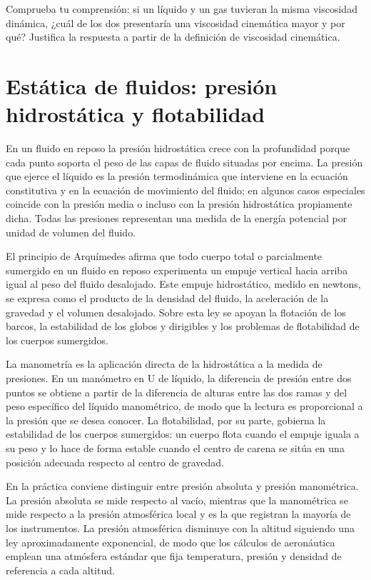 \documentclass{book}
\begin{document}
\begin{tcolorbox}[title={Autoficha}, studiumcheck, breakable]

Comprueba tu comprensión: si un líquido y un gas tuvieran la misma viscosidad dinámica, ¿cuál de los dos presentaría una viscosidad cinemática mayor y por qué? Justifica la respuesta a partir de la definición de viscosidad cinemática.
\end{tcolorbox}

\chapter{Estática de fluidos: presión hidrostática y flotabilidad}

En un fluido en reposo la presión hidrostática crece con la profundidad porque cada punto soporta el peso de las capas de fluido situadas por encima. La presión que ejerce el líquido es la presión termodinámica que interviene en la ecuación constitutiva y en la ecuación de movimiento del fluido; en algunos casos especiales coincide con la presión media o incluso con la presión hidrostática propiamente dicha. Todas las presiones representan una medida de la energía potencial por unidad de volumen del fluido.

El principio de Arquímedes afirma que todo cuerpo total o parcialmente sumergido en un fluido en reposo experimenta un empuje vertical hacia arriba igual al peso del fluido desalojado. Este empuje hidrostático, medido en newtons, se expresa como el producto de la densidad del fluido, la aceleración de la gravedad y el volumen desalojado. Sobre esta ley se apoyan la flotación de los barcos, la estabilidad de los globos y dirigibles y los problemas de flotabilidad de los cuerpos sumergidos.

La manometría es la aplicación directa de la hidrostática a la medida de presiones. En un manómetro en U de líquido, la diferencia de presión entre dos puntos se obtiene a partir de la diferencia de alturas entre las dos ramas y del peso específico del líquido manométrico, de modo que la lectura es proporcional a la presión que se desea conocer. La flotabilidad, por su parte, gobierna la estabilidad de los cuerpos sumergidos: un cuerpo flota cuando el empuje iguala a su peso y lo hace de forma estable cuando el centro de carena se sitúa en una posición adecuada respecto al centro de gravedad.

En la práctica conviene distinguir entre presión absoluta y presión manométrica. La presión absoluta se mide respecto al vacío, mientras que la manométrica se mide respecto a la presión atmosférica local y es la que registran la mayoría de los instrumentos. La presión atmosférica disminuye con la altitud siguiendo una ley aproximadamente exponencial, de modo que los cálculos de aeronáutica emplean una atmósfera estándar que fija temperatura, presión y densidad de referencia a cada altitud.
\end{document}
